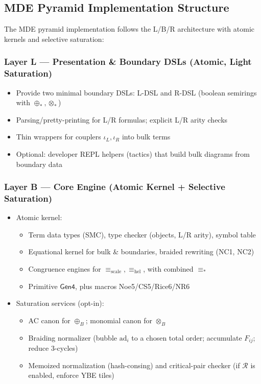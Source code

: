 \subsection{MDE Pyramid Implementation Structure}

The MDE pyramid implementation follows the L/B/R architecture with atomic kernels and selective saturation:

\subsubsection{Layer L — Presentation \& Boundary DSLs (Atomic, Light Saturation)}
\begin{itemize}
\item Provide two minimal boundary DSLs: L-DSL and R-DSL (boolean semirings with $\oplus_*, \otimes_*$)
\item Parsing/pretty-printing for L/R formulas; explicit L/R arity checks
\item Thin wrappers for couplers $\iota_L, \iota_R$ into bulk terms
\item Optional: developer REPL helpers (tactics) that build bulk diagrams from boundary data
\end{itemize}

\subsubsection{Layer B — Core Engine (Atomic Kernel + Selective Saturation)}
\begin{itemize}
\item Atomic kernel:
  \begin{itemize}
  \item Term data types (SMC), type checker (objects, L/R arity), symbol table
  \item Equational kernel for bulk \& boundaries, braided rewriting (NC1, NC2)
  \item Congruence engines for $\equiv_{\text{scale}}, \equiv_{\text{hel}}$, with combined $\equiv_*$
  \item Primitive $\mathsf{Gen4}$, plus macros Noe5/CS5/Rice6/NR6
  \end{itemize}
\item Saturation services (opt-in):
  \begin{itemize}
  \item AC canon for $\oplus_B$; monomial canon for $\otimes_B$
  \item Braiding normalizer (bubble $\text{ad}_i$ to a chosen total order; accumulate $F_{ij}$; reduce 3-cycles)
  \item Memoized normalization (hash-consing) and critical-pair checker (if $\mathcal{R}$ is enabled, enforce YBE tiles)
  \end{itemize}
\end{itemize}

